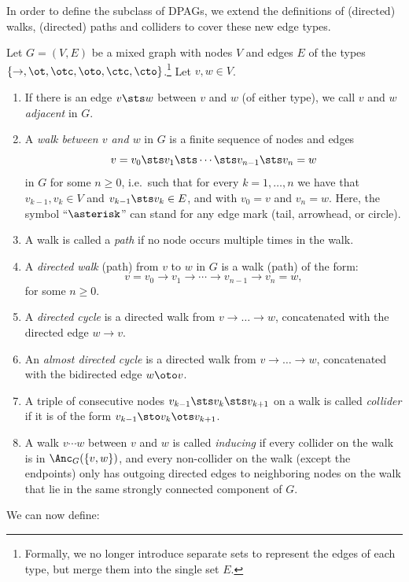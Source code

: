 In order to define the subclass of DPAGs, we 
extend the definitions of (directed) walks, (directed) paths and colliders to cover these new edge types.
\begin{Def}\label{def:more_walks}
  Let $G=(V,E)$ be a mixed graph with nodes $V$ and edges $E$ of the types $\{\to,\ot,\otc,\oto,\ctc,\cto\}$.\footnote{Formally, we no longer introduce separate sets to represent the edges of each type, but merge them into the single set $E$.}
  Let $v,w \in V$.
  \begin{enumerate}
    \item If there is an edge $v \sts w$ between $v$ and $w$ (of either type), we call $v$ and $w$ \emph{adjacent} in $G$.
    \item A \emph{walk between $v$ and $w$} in $G$ is a finite sequence of nodes and edges 
        \[v=v_0 \sts v_1 \sts  \cdots \sts v_{n-1} \sts v_n=w\] 
        in $G$ for some $n \ge 0$, i.e.\ such that for every $k=1,\dots,n$ 
        we have that $v_{k-1},v_k \in V$ and $v_{k-1} \sts v_k \in E$, and with $v_0=v$ and $v_n=w$.
        Here, the symbol ``$\asterisk$'' can stand for any edge mark (tail, arrowhead, or circle).
    \item A walk is called a \emph{path} if no node occurs multiple times in the walk.
    \item A \emph{directed walk} (path) from $v$ to $w$ in $G$ is a walk (path) of the form:
        \[v=v_0 \to v_1 \to  \cdots \to v_{n-1} \to v_n=w,\]
        for some $n \ge 0$.
    \item A \emph{directed cycle} is a directed walk from $v \to \dots \to w$, concatenated with
      the directed edge $w \to v$.
    \item An \emph{almost directed cycle} is a directed walk from $v \to \dots \to w$, concatenated
      with the bidirected edge $w \oto v$.
    \item A triple of consecutive nodes $v_{k-1} \sts v_k \sts v_{k+1}$ on a walk is called \emph{collider}
      if it is of the form $v_{k-1} \sto v_k \ots v_{k+1}$.
    \item A walk $v \cdots w$ between $v$ and $w$ is called \emph{inducing} if every collider on the walk is in $\Anc_G(\{v,w\})$, and every non-collider on the walk (except the endpoints) only has outgoing directed edges to neighboring nodes on the walk that lie in the same strongly connected component of $G$.
  \end{enumerate}
\end{Def}
We can now define:

